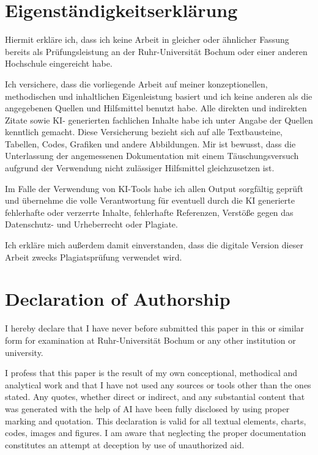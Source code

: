 \newpage
\section*{Eigenständigkeitserklärung}
Hiermit erkläre ich, dass ich keine Arbeit in gleicher oder ähnlicher Fassung bereits als Prüfungsleistung an der Ruhr-Universität
Bochum oder einer anderen Hochschule eingereicht habe.

\noindent
Ich versichere, dass die vorliegende Arbeit auf meiner konzeptionellen, methodischen und inhaltlichen Eigenleistung basiert und
ich keine anderen als die angegebenen Quellen und Hilfsmittel benutzt habe. Alle direkten und indirekten Zitate sowie KI-
generierten fachlichen Inhalte habe ich unter Angabe der Quellen kenntlich gemacht. Diese Versicherung bezieht sich auf alle
Textbausteine, Tabellen, Codes, Grafiken und andere Abbildungen. Mir ist bewusst, dass die Unterlassung der angemessenen
Dokumentation mit einem Täuschungsversuch aufgrund der Verwendung nicht zulässiger Hilfsmittel gleichzusetzen ist.

\noindent
Im Falle der Verwendung von KI-Tools habe ich allen Output sorgfältig geprüft und übernehme die volle Verantwortung für
eventuell durch die KI generierte fehlerhafte oder verzerrte Inhalte, fehlerhafte Referenzen, Verstöße gegen das Datenschutz- und
Urheberrecht oder Plagiate.

\noindent
Ich erkläre mich außerdem damit einverstanden, dass die digitale Version dieser Arbeit zwecks Plagiatsprüfung verwendet wird.


\vspace{5mm}
\section*{Declaration of Authorship}
I hereby declare that I have never before submitted this paper in this or similar form for examination at Ruhr-Universität Bochum or
any other institution or university.

\noindent
I profess that this paper is the result of my own conceptional, methodical and analytical work and that I have not used any sources
or tools other than the ones stated. Any quotes, whether direct or indirect, and any substantial content that was generated with the
help of AI have been fully disclosed by using proper marking and quotation. This declaration is valid for all textual elements, charts,
codes, images and figures. I am aware that neglecting the proper documentation constitutes an attempt at deception by use of
unauthorized aid.

